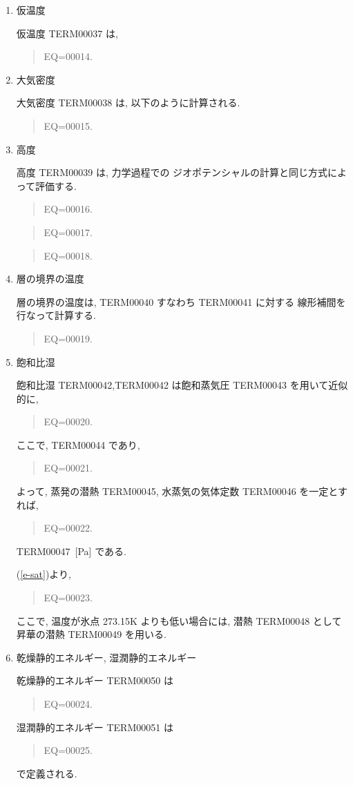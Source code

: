 \begin{enumerate}
\item 仮温度

仮温度 TERM00037 は, 
\begin{quote}
EQ=00014.
\end{quote}

\item 大気密度

大気密度 TERM00038 は, 以下のように計算される.
\begin{quote}
EQ=00015.
\end{quote}

\item 高度

高度 TERM00039 は, 力学過程での
ジオポテンシャルの計算と同じ方式によって評価する.
\begin{quote}
EQ=00016.
\end{quote}
\begin{quote}
EQ=00017.
\end{quote}
%
\begin{quote}
EQ=00018.
\end{quote}


\item 層の境界の温度

層の境界の温度は, TERM00040 すなわち TERM00041 に対する
線形補間を行なって計算する.
\begin{quote}
EQ=00019.
\end{quote}

\item 飽和比湿

飽和比湿 TERM00042,TERM00042
は飽和蒸気圧 TERM00043 を用いて近似的に,
%
\begin{quote}
EQ=00020.
\end{quote}
%
ここで, TERM00044 であり,
%
\begin{quote}
EQ=00021.
\label{e-sat}
\end{quote}
%
よって, 蒸発の潜熱 TERM00045, 水蒸気の気体定数 TERM00046 を一定とすれば,
%
\begin{quote}
EQ=00022.
\end{quote}
%
TERM00047\ [Pa] である.

(\ref{e-sat})より,
%
\begin{quote}
EQ=00023.
\end{quote}

ここで, 温度が氷点 273.15K よりも低い場合には,
潜熱 TERM00048 として昇華の潜熱 TERM00049 を用いる.

\item 乾燥静的エネルギー, 湿潤静的エネルギー

乾燥静的エネルギー TERM00050 は
\begin{quote}
EQ=00024.
\end{quote}
%
湿潤静的エネルギー TERM00051 は
\begin{quote}
EQ=00025.
\end{quote}
で定義される.

\end{enumerate}
